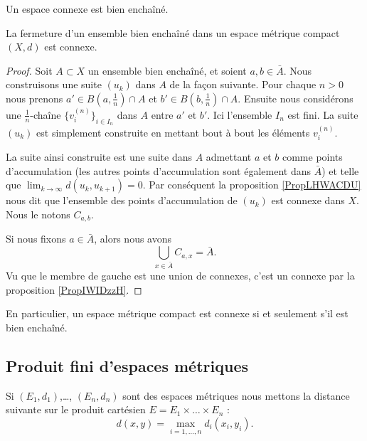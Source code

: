 \begin{proposition}
    Un espace connexe est bien enchaîné.
\end{proposition}

\begin{proposition}
    La fermeture d'un ensemble bien enchaîné dans un espace métrique compact \( (X,d)\) est connexe.
\end{proposition}

\begin{proof}
    Soit \( A\subset X\) un ensemble bien enchaîné, et soient \( a,b\in \bar A\). Nous construisons une suite \( (u_k)\) dans \( A\) de la façon suivante. Pour chaque \( n>0\) nous prenons \( a'\in B(a,\frac{1}{ n })\cap A\) et \( b'\in B(b,\frac{1}{ n })\cap A\). Ensuite nous considérons une \( \frac{1}{ n }\)-chaîne \( \{ v_i^{(n)} \}_{i\in I_n}\) dans \( A\) entre \( a'\) et \( b'\). Ici l'ensemble \( I_n\) est fini. La suite \( (u_k)\) est simplement construite en mettant bout à bout les éléments \( v_i^{(n)}\).
 
    La suite ainsi construite est une suite dans \( A\) admettant \( a\) et \( b\) comme points d'accumulation (les autres points d'accumulation sont également dans \( \bar A\)) et telle que \( \lim_{k\to \infty} d(u_k,u_{k+1})=0\). Par conséquent la proposition \ref{PropLHWACDU} nous dit que l'ensemble des points d'accumulation de \( (u_k)\) est connexe dans \( X\). Nous le notons \( C_{a,b}\).

    Si nous fixons \( a\in \bar A\), alors nous avons
    \begin{equation}
        \bigcup_{x\in \bar A}C_{a,x}=\bar A.
    \end{equation}
    Vu que le membre de gauche est une union de connexes, c'est un connexe par la proposition \ref{PropIWIDzzH}.
\end{proof}
En particulier, un espace métrique compact est connexe si et seulement s'il est bien enchaîné.

\subsection{Produit fini d'espaces métriques}

\begin{definition}\label{DefZTHxrHA}
    Si \( (E_1,d_1)\),\ldots, \( (E_n,d_n)\) sont des espaces métriques nous mettons la distance suivante sur le produit cartésien \( E=E_1\times\ldots\times E_n\) :
    \begin{equation}
        d(x,y)=\max_{i=1,\ldots, n}d_i(x_i,y_i).
    \end{equation}
\end{definition}

